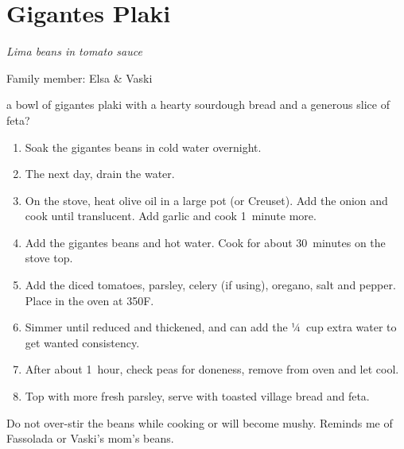 \chapter{Gigantes Plaki}
\label{ch:gigantes-plaki}


\textit{Lima beans in tomato sauce}

Family member: Elsa \& Vaski


 a bowl of gigantes plaki with a hearty sourdough bread and a generous slice of feta?

\bigskip

\begin{enumerate}
    \item Soak the gigantes beans in cold water overnight.
    \item The next day, drain the water.
    \item On the stove, heat olive oil in a large pot (or Creuset). Add the onion and cook until translucent. Add garlic and cook 1~minute more.
    \item Add the gigantes beans and hot water. Cook for about 30~minutes on the stove top.
    \item Add the diced tomatoes, parsley, celery (if using), oregano, salt and pepper. Place in the oven at 350\degree F.
    \item Simmer until reduced and thickened, and can add the ¼~cup extra water to get wanted consistency.
    \item After about 1~hour, check peas for doneness, remove from oven and let cool.
    \item Top with more fresh parsley, serve with toasted village bread and feta.
\end{enumerate}

Do not over-stir the beans while cooking or will become mushy.
Reminds me of Fassolada or Vaski's mom's beans.
